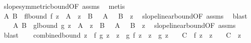 \begin{isabellebody}
\ slope{\isacharunderscore}{\kern0pt}symmetric{\isacharunderscore}{\kern0pt}bound{\isacharbrackleft}{\kern0pt}OF\ assms{\isacharparenleft}{\kern0pt}{}{\isacharparenright}{\kern0pt}{\isacharbrackright}{\kern0pt}\ \isamarkupfalse%
\ metis\isanewline
\isanewline
\ \ \isamarkupfalse%
\ A\ B\ \ f{\isacharunderscore}{\kern0pt}lbound{\isacharcolon}{\kern0pt}\ {\isachardoublequoteopen}{\isasymbar}f\ z{\isasymbar}\ {\isasymle}\ A\ {\isacharasterisk}{\kern0pt}\ {\isasymbar}z{\isasymbar}\ {\isacharplus}{\kern0pt}\ B{\isachardoublequoteclose}\ {\isachardoublequoteopen}{}\ {\isasymle}\ A{\isachardoublequoteclose}\ {\isachardoublequoteopen}{}\ {\isasymle}\ B{\isachardoublequoteclose}\ \ z\ \isamarkupfalse%
\ slope{\isacharunderscore}{\kern0pt}linear{\isacharunderscore}{\kern0pt}bound{\isacharbrackleft}{\kern0pt}OF\ assms{\isacharparenleft}{\kern0pt}{}{\isacharparenright}{\kern0pt}{\isacharbrackright}{\kern0pt}\ \isamarkupfalse%
\ blast\isanewline
\ \ \isamarkupfalse%
\ A{\isacharprime}{\kern0pt}\ B{\isacharprime}{\kern0pt}\ \ g{\isacharunderscore}{\kern0pt}lbound{\isacharcolon}{\kern0pt}\ {\isachardoublequoteopen}{\isasymbar}g\ z{\isasymbar}\ {\isasymle}\ A{\isacharprime}{\kern0pt}\ {\isacharasterisk}{\kern0pt}\ {\isasymbar}z{\isasymbar}\ {\isacharplus}{\kern0pt}\ B{\isacharprime}{\kern0pt}{\isachardoublequoteclose}\ {\isachardoublequoteopen}{}\ {\isasymle}\ A{\isacharprime}{\kern0pt}{\isachardoublequoteclose}\ {\isachardoublequoteopen}{}\ {\isasymle}\ B{\isacharprime}{\kern0pt}{\isachardoublequoteclose}\ \ z\ \isamarkupfalse%
\ slope{\isacharunderscore}{\kern0pt}linear{\isacharunderscore}{\kern0pt}bound{\isacharbrackleft}{\kern0pt}OF\ assms{\isacharparenleft}{\kern0pt}{}{\isacharparenright}{\kern0pt}{\isacharbrackright}{\kern0pt}\ \isamarkupfalse%
\ blast\isanewline
\isanewline
\ \ \isamarkupfalse%
\ combined{\isacharunderscore}{\kern0pt}bound{\isacharcolon}{\kern0pt}\ {\isachardoublequoteopen}{\isasymbar}z\ {\isacharasterisk}{\kern0pt}\ f\ {\isacharparenleft}{\kern0pt}g\ z{\isacharparenright}{\kern0pt}\ {\isacharminus}{\kern0pt}\ z\ {\isacharasterisk}{\kern0pt}\ g\ {\isacharparenleft}{\kern0pt}f\ z{\isacharparenright}{\kern0pt}{\isasymbar}\ {\isasymle}\ {\isacharparenleft}{\kern0pt}{\isasymbar}z{\isasymbar}\ {\isacharplus}{\kern0pt}\ {\isasymbar}g\ z{\isasymbar}\ {\isacharplus}{\kern0pt}\ {}{\isacharparenright}{\kern0pt}\ {\isacharasterisk}{\kern0pt}\ C\ {\isacharplus}{\kern0pt}\ {\isacharparenleft}{\kern0pt}{\isasymbar}f\ z{\isasymbar}\ {\isacharplus}{\kern0pt}\ {\isasymbar}z{\isasymbar}\ {\isacharplus}{\kern0pt}\ {}{\isacharparenright}{\kern0pt}\ {\isacharasterisk}{\kern0pt}\ C{\isacharprime}{\kern0pt}{\isachardoublequoteclose}\ \ z\ \isanewline

\end{isabellebody}
